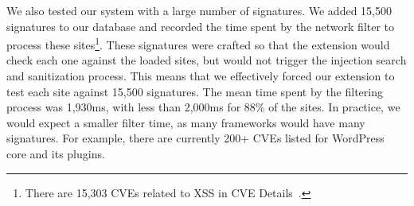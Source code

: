 We also tested our system with a large number of signatures. We added
15,500 signatures to our database and recorded the time spent by the
network filter to process these sites\footnote{There are 15,303 CVEs
  related to XSS in CVE Details~\cite{xsscves}.}. These signatures
were crafted so that the extension would check each one against the
loaded sites, but would not trigger the injection search and
sanitization process.  This means that we effectively forced our
extension to test each site against 15,500 signatures. The mean time
spent by the filtering process was 1,930ms, with less than 2,000ms for
88\% of the sites. In practice, we would expect a smaller filter time,
as many frameworks would have many signatures. For example, there are
currently 200+ CVEs listed for WordPress core and its plugins.


